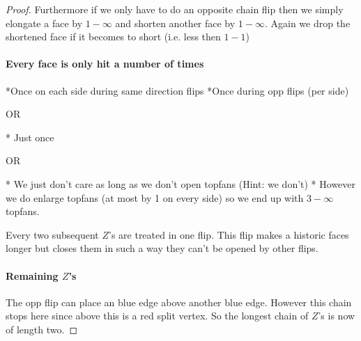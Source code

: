 \begin{proof}
    Furthermore if we only have to do an opposite chain flip then we simply elongate a face by $1-\infty$ and shorten another face by $1-\infty$. Again we drop the shortened face if it becomes to short (i.e. less then $1-1$)

    \paragraph{Every face is only hit a number of times}
    *Once on each side during same direction flips
    *Once during opp flips (per side)

    OR

    * Just once

    OR

    * We just don't care as long as we don't open topfans (Hint: we don't)
    * However we do enlarge topfans (at most by 1 on every side) so we end up with $3-\infty$ topfans.

    Every two subsequent $Z$'s are treated in one flip. This flip makes a historic faces longer but closes them in such a way they can't be opened by other flips.

    \paragraph{Remaining $Z$'s}
    The opp flip can place an blue edge above another blue edge. However this chain stops here since above this is a red split vertex. So the longest chain of $Z$'s is now of length two.
  \end{proof}
